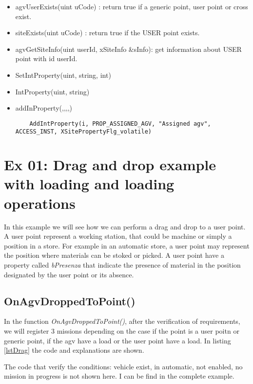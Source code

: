 \begin{itemize}
	\item agvUserExists(uint uCode) : return true if a generic point, user point or cross exist.
	\item siteExists(uint uCode) : return true if the USER point exists.
	\item agvGetSiteInfo(uint userId, xSiteInfo \&sInfo): get information about USER point with id userId.\\
\end{itemize}

\begin{itemize}
	\item SetIntProperty(uint, string, int)
	\item IntProperty(uint, string)
	\item addInProperty(,,,,)
	\begin{lstlisting}
	AddIntProperty(i, PROP_ASSIGNED_AGV, "Assigned agv", ACCESS_INST, XSitePropertyFlg_volatile)
	\end{lstlisting}
\end{itemize}	


\section{Ex 01: Drag and drop example with loading and loading operations}

In this example we will see how we can perform a drag and drop to a user point. A user point represent a working station, that could be machine or simply a position in a store. For example in an automatic store, a user point may represent the position where materials can be stoked or picked. A user point have a property called \textit{bPresenza} that indicate the presence of material in the position designated by the user point or its absence.\\

\subsection*{OnAgvDroppedToPoint()}
In the function \textit{OnAgvDroppedToPoint()}, after the verification of requirements, we will register 3 missions depending on the case if the point is a user poitn or generic point, if the agv have a load or the user point have a load. In listing \ref{lstDrag} the code and explanations are shown.

The code that verify the conditions: vehicle exist, in automatic, not enabled, no mission in progress is not shown here. I can be find in the complete example.\\


